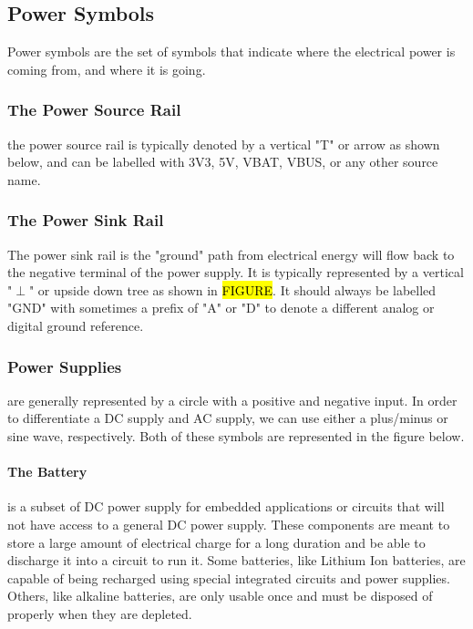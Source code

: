     \subsection{Power Symbols} 
    Power symbols are the set of symbols that indicate where the electrical power is coming from, and where it is going.

        \subsubsection*{The Power Source Rail} 
        the power source rail is typically denoted by a vertical "T" or arrow as shown below, and can be labelled with 3V3,
        5V, VBAT, VBUS, or any other source name.


        \subsubsection*{The Power Sink Rail} 
        The power sink rail is the "ground" path from electrical energy will flow back to the negative terminal of the power supply. 
        It is typically represented by a vertical "$\perp$" or upside down tree as shown in \hl{FIGURE}.
        It should always be labelled "GND" with sometimes a prefix of "A" or "D" to denote a different analog or digital ground reference.


        \subsubsection*{Power Supplies} are generally represented by a circle with a positive and negative input.
        In order to differentiate a DC supply and AC supply, we can use either a plus/minus or sine wave, respectively.
        Both of these symbols are represented in the figure below.


        \paragraph*{The Battery} is a subset of DC power supply for embedded applications or circuits that will not have access to a general DC power supply.
        These components are meant to store a large amount of electrical charge for a long duration and be able to discharge it into a circuit to run it.
        Some batteries, like Lithium Ion batteries, are capable of being recharged using special integrated circuits and power supplies.
        Others, like alkaline batteries, are only usable once and must be disposed of properly when they are depleted.

